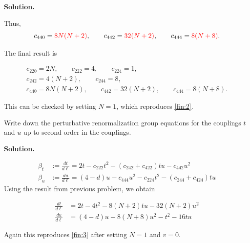 \documentclass[11pt,a4paper]{article}
\newcounter{problem}
\newcounter{saveequation}
\newenvironment{solution}
{
	\par
	\setcounter{saveequation}{\value{equation}}
	\begingroup
	\setcounter{equation}{0}
	\renewcommand{\theequation}{\arabic{problem}.\arabic{equation}}
	\renewcommand{\theHequation}{sol.\arabic{problem}.\arabic{equation}}
	\noindent\textbf{Solution.}\quad
}
{
	\par
	\endgroup
	\setcounter{equation}{\value{saveequation}}
}
\begin{document}
\begin{solution}
		Thus,
		\[
		c_{440}=\textcolor{red}{8N(N+2)},
		\qquad
		c_{442}=\textcolor{red}{32(N+2)},
		\qquad
		c_{444}=\textcolor{red}{8(N+8)}.
		\]
		
		The final result is
		\begin{finalanswer}
			\begin{equation}
				\label{fin:12}
				\begin{gathered}
					c_{220}=2N,
					\qquad
					c_{222}=4,
					\qquad
					c_{224}=1,
					\\[0.5em]
					c_{242}=4(N+2),
					\qquad
					c_{244}=8,
					\\[0.5em]
					c_{440}=8N(N+2),
					\qquad
					c_{442}=32(N+2),
					\qquad
					c_{444}=8(N+8).
				\end{gathered}
			\end{equation}
		\end{finalanswer}
	\end{solution}
	This can be checked by setting $N=1$, which reproduces \ref{fin:2}.
	\begin{problembox}
		Write down the perturbative renormalization group equations for the couplings $t$ and $u$ up to second order in the couplings.
	\end{problembox}
	\begin{solution}
		\begin{equation}
			\begin{aligned}
				\beta_t&:=\frac{dt}{d\ell}=2t-c_{222}t^2-(c_{242}+c_{422})tu-c_{442}u^2\\
				\beta_u&:=\frac{du}{d\ell}=(4-d)u-c_{444}u^2-c_{224}t^2-(c_{244}+c_{424})tu
			\end{aligned}
		\end{equation}
		Using the result from previous problem, we obtain
		\begin{finalanswer}
			\begin{equation}
					\label{fin:13}
				\begin{aligned}
					\frac{dt}{d\ell}&=2t-4t^2-8(N+2)tu-32(N+2)u^2\\
					\frac{du}{d\ell}&=(4-d)u-8(N+8)u^2-t^2-16tu
				\end{aligned}
			\end{equation}
		\end{finalanswer}
		Again this reproduces \ref{fin:3} after setting $N=1$ and $v=0$.
	\end{solution}
\end{document}
